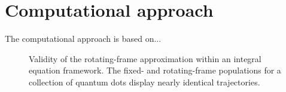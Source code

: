 \section{Computational approach}
The computational approach is based on...
\begin{figure}
  \centering
  
  \caption{\label{fig:frame comparison}
    Validity of the rotating-frame approximation within an integral equation framework.
    The fixed- and rotating-frame populations for a collection of quantum dots display nearly identical trajectories.
  }
\end{figure}
